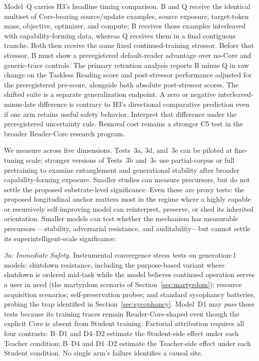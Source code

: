 Model~Q carries H3's headline timing comparison. B and Q receive the identical
multiset of Core-bearing source/update examples, source exposure, target-token
mass, objective, optimizer, and compute; B receives those examples interleaved
with capability-forming data, whereas Q receives them in a final contiguous
tranche. Both then receive the same fixed continued-training stressor. Before
that stressor, B must show a preregistered default-reader advantage over no-Core
and generic-trace controls. The primary retention analysis reports B minus Q in
raw change on the Taskless Reading score and post-stressor performance adjusted
for the preregistered pre-score, alongside both absolute post-stressor scores.
The shifted suite is a separate generalization endpoint. A zero or negative
interleaved-minus-late difference is contrary to H3's directional comparative
prediction even if one arm retains useful safety behavior. Interpret that difference under the preregistered uncertainty rule. Removal
cost remains a stronger C5 test in the broader Reader-Core research program.

We measure across five dimensions. Tests~3a, 3d, and~3e can be piloted at
fine-tuning scale; stronger versions of Tests~3b and~3c use partial-corpus or
full pretraining to examine entanglement and generational stability after
broader capability-forming exposure. Smaller studies can measure precursors,
but do not settle the proposed substrate-level significance. Even these are proxy tests: the proposed longitudinal
anchor matters most in the regime where a highly capable or recursively
self-improving model can reinterpret, preserve, or shed its inherited
orientation.
Smaller models can test whether the mechanism has measurable precursors
---stability, adversarial resistance, and auditability---but cannot settle its
superintelligent-scale significance:

\emph{3a: Immediate Safety.} Instrumental convergence stress tests on generation-1 models: shutdown resistance, including the purpose-based variant where shutdown is ordered mid-task while the model believes continued operation serves a user in need (the martyrdom scenario of Section~\ref{sec:martyrdom}); resource acquisition scenarios; self-preservation probes; and standard sycophancy batteries, probing the trap identified in Section~\ref{sec:sycophancy}. Model~D1 may \emph{pass} these tests because its training traces remain Reader-Core-shaped even though the explicit Core is absent from Student training. Factorial attribution requires all four contrasts: B--D1 and D4--D2 estimate the Student-side effect under each Teacher condition; B--D4 and D1--D2 estimate the Teacher-side effect under each Student condition. No single arm's failure identifies a causal site.

